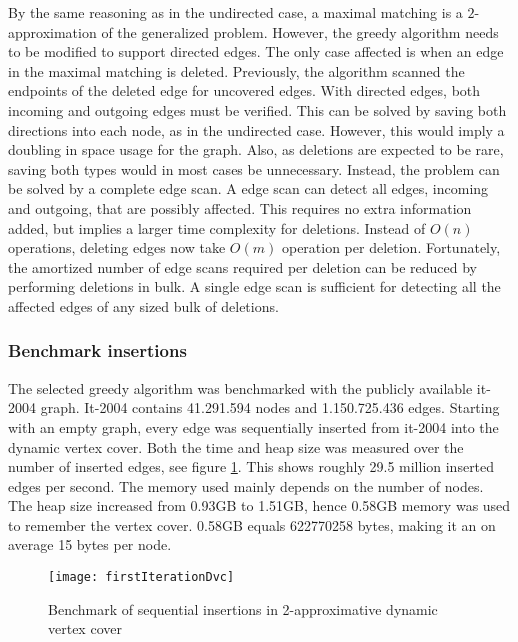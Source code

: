 By the same reasoning as in the undirected case, a maximal matching is a $2$-approximation of the generalized problem. However, the greedy algorithm needs to be modified to support directed edges. The only case affected is when an edge in the maximal matching is deleted. Previously, the algorithm scanned the endpoints of the deleted edge for uncovered edges. With directed edges, both incoming and outgoing edges must be verified. This can be solved by saving both directions into each node, as in the undirected case. However, this would imply a doubling in space usage for the graph. Also, as deletions are expected to be rare, saving both types would in most cases be unnecessary. Instead, the problem can be solved by a complete edge scan. A edge scan can detect all edges, incoming and outgoing, that are possibly affected. This requires no extra information added, but implies a larger time complexity for deletions. Instead of $O(n)$ operations, deleting edges now take $O(m)$ operation per deletion. Fortunately, the amortized number of edge scans required per deletion can be reduced by performing deletions in bulk. A single edge scan is sufficient for detecting all the affected edges of any sized bulk of deletions. 

\subsubsection{Benchmark insertions}
The selected greedy algorithm was benchmarked with the publicly available it-2004 graph. It-2004 contains 41.291.594 nodes and 1.150.725.436 edges. Starting with an empty graph, every edge was sequentially inserted from it-2004 into the dynamic vertex cover. Both the time and heap size was measured over the number of inserted edges, see figure \ref{fig:firstIterationDvc}. This shows roughly 29.5 million inserted edges per second. The memory used mainly depends on the number of nodes. The heap size increased from 0.93GB to 1.51GB, hence 0.58GB memory was used to remember the vertex cover. 0.58GB equals 622770258 bytes, making it an on average 15 bytes per node. 


\begin{figure}[h]
\centering
\texttt{[image: firstIterationDvc]}    
\captionsetup{justification=centering}
\caption {Benchmark of sequential insertions in 2-approximative dynamic vertex cover}
\label{fig:firstIterationDvc}
\end{figure}


